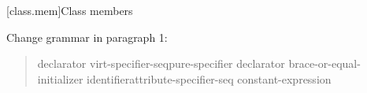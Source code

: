 \setcounter{chapter}{12}
\setcounter{section}{1}

[class.mem]{Class members}

Change grammar in paragraph 1:

\begin{quote}
\pnum
\begin{bnf}
\br
    declarator virt-specifier-seq\opt pure-specifier\opt
    declarator brace-or-equal-initializer\opt
    identifier\opt attribute-specifier-seq\opt \tcode{:} constant-expression
\end{bnf}
\end{quote}
